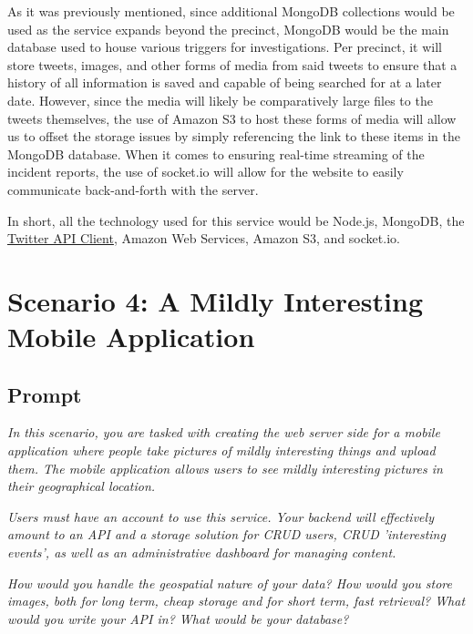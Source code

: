\documentclass[11pt]{article}
\begin{document}
	As it was previously mentioned, since additional MongoDB collections would be used as the service expands beyond the precinct, MongoDB would be the main database used to house various triggers for investigations. Per precinct, it will store tweets, images, and other forms of media from said tweets to ensure that a history of all information is saved and capable of being searched for at a later date. However, since the media will likely be comparatively large files to the tweets themselves, the use of Amazon S3 to host these forms of media will allow us to offset the storage issues by simply referencing the link to these items in the MongoDB database. When it comes to ensuring real-time streaming of the incident reports, the use of socket.io will allow for the website to easily communicate back-and-forth with the server.

	In short, all the technology used for this service would be Node.js, MongoDB, the \href{https://www.npmjs.com/package/twitter-api-client}{Twitter API Client}, Amazon Web Services, Amazon S3, and socket.io.

	\section*{Scenario 4: A Mildly Interesting Mobile Application}
	\subsection*{Prompt}
	\textit{In this scenario, you are tasked with creating the web server side for a mobile application where people take pictures of mildly interesting things and upload them. The mobile application allows users to see mildly interesting pictures in their geographical location.}

	\textit{Users must have an account to use this service. Your backend will effectively amount to an API and a storage solution for CRUD users, CRUD 'interesting events', as well as an administrative dashboard for managing content.}

	\textit{How would you handle the geospatial nature of your data? How would you store images, both for long term, cheap storage and for short term, fast retrieval? What would you write your API in? What would be your database?}
\end{document}
